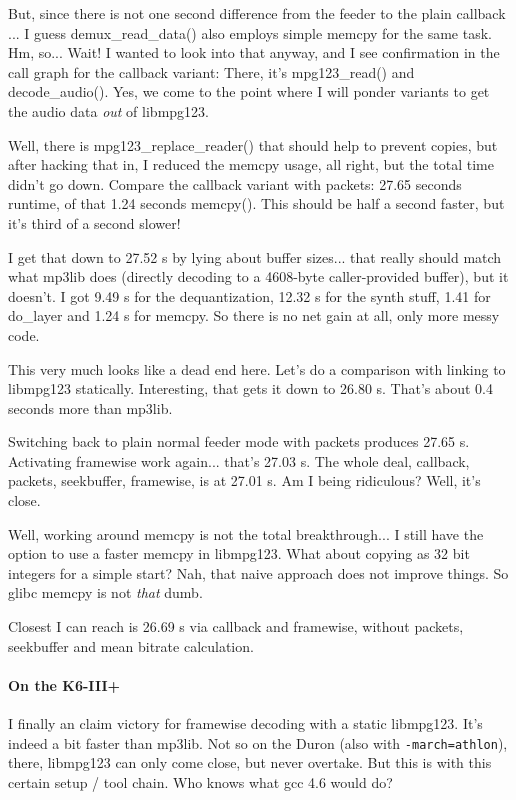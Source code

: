 \documentclass[a4paper,12pt]{scrartcl}
\begin{document}
But, since there is not one second difference from the feeder to the plain callback ... I guess demux\_read\_data() also employs simple memcpy for the same task. Hm, so...
Wait! I wanted to look into that anyway, and I see confirmation in the call graph for the callback variant: There, it's mpg123\_read() and decode\_audio().
Yes, we come to the point where I will ponder variants to get the audio data {\em out} of libmpg123. 

Well, there is mpg123\_replace\_reader() that should help to prevent copies, but after hacking that in, I reduced the memcpy usage, all right, but the total time didn't go down. Compare the callback variant with packets: 27.65 seconds runtime, of that 1.24 seconds memcpy().
This should be half a second faster, but it's third of a second slower!

I get that down to 27.52 s by lying  about buffer sizes... that really should match what mp3lib does (directly decoding to a 4608-byte caller-provided buffer), but it doesn't.
I got 9.49 s for the dequantization, 12.32 s for the synth stuff, 1.41 for do\_layer and 1.24 s for memcpy.
So there is no net gain at all, only more messy code.

This very much looks like a dead end here. Let's do a comparison with linking to libmpg123 statically. Interesting, that gets it down to 26.80 s. That's about 0.4 seconds more than mp3lib.

Switching back to plain normal feeder mode with packets produces 27.65 s. Activating framewise work again... that's 27.03 s. The whole deal, callback, packets, seekbuffer, framewise, is at 27.01 s.
Am I being ridiculous? Well, it's close.

Well, working around memcpy is not the total breakthrough... I still have the option to use a faster memcpy in libmpg123. What about copying as 32 bit integers for a simple start? Nah, that naive approach does not improve things. So glibc memcpy is not {\em that} dumb.

Closest I can reach is 26.69 s via callback and framewise, without packets, seekbuffer and mean bitrate calculation.

\paragraph{On the K6-III+}
I finally an claim victory for framewise decoding with a static libmpg123.
It's indeed a bit faster than mp3lib. Not so on the Duron (also with \verb:-march=athlon:), there, libmpg123 can only come close, but never overtake.
But this is with this certain setup / tool chain. Who knows what gcc 4.6 would do?
\end{document}
